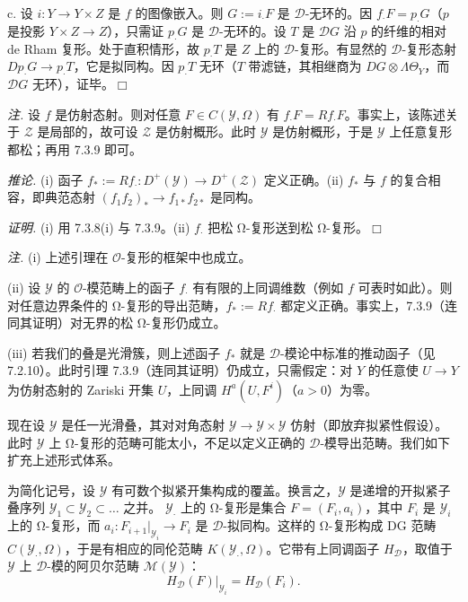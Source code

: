 c. 设 $i:Y\to Y\times Z$ 是 $f$ 的图像嵌入。则 $G:=i_{\cdot}F$ 是 $\mathcal{D}$-无环的。因 $f_{\cdot}F=p_{\cdot}G$（$p$ 是投影 $Y\times Z\to Z$），只需证 $p_{\cdot}G$ 是 $\mathcal{D}$-无环的。设 $T$ 是 $\mathcal{D}G$ 沿 $p$ 的纤维的相对 de Rham 复形。处于直积情形，故 $p_{\cdot}T$ 是 $Z$ 上的 $\mathcal{D}$-复形。有显然的 $\mathcal{D}$-复形态射 $Dp_{\cdot}G\to p_{\cdot}T$，它是拟同构。因 $p_{\cdot}T$ 无环（$T$ 带滤链，其相继商为 $DG\otimes\Lambda\Theta_{Y}$，而 $\mathcal{D}G$ 无环），证毕。\hfill$\Box$

\emph{注.} 设 $f$ 是仿射态射。则对任意 $F\in C(\mathcal{Y},\Omega)$ 有 $f_{\cdot}F=Rf_{\cdot}F$。事实上，该陈述关于 $\mathcal{Z}$ 是局部的，故可设 $\mathcal{Z}$ 是仿射概形。此时 $\mathcal{Y}$ 是仿射概形，于是 $\mathcal{Y}$ 上任意复形都松；再用 7.3.9 即可。

 \emph{推论.} (i) 函子 $f_{*}:=Rf_{\cdot}:D^{+}(\mathcal{Y})\to D^{+}(\mathcal{Z})$ 定义正确。(ii) $f_{*}$ 与 $f$ 的复合相容，即典范态射 $(f_{1}f_{2})_{*}\to f_{1*}f_{2*}$ 是同构。

\emph{证明.} (i) 用 7.3.8(i) 与 7.3.9。(ii) $f_{\cdot}$ 把松 Ω-复形送到松 Ω-复形。\hfill$\Box$

 \emph{注.} (i) 上述引理在 $\mathcal{O}$-复形的框架中也成立。

(ii) 设 $\mathcal{Y}$ 的 $\mathcal{O}$-模范畴上的函子 $f_{\cdot}$ 有有限的上同调维数（例如 $f$ 可表时如此）。则对任意边界条件的 Ω-复形的导出范畴，$f_{*}:=Rf_{\cdot}$ 都定义正确。事实上，7.3.9（连同其证明）对无界的松 Ω-复形仍成立。

(iii) 若我们的叠是光滑簇，则上述函子 $f_{*}$ 就是 $\mathcal{D}$-模论中标准的推动函子（见 7.2.10）。此时引理 7.3.9（连同其证明）仍成立，只需假定：对 $Y$ 的任意使 $U\to Y$ 为仿射态射的 Zariski 开集 $U$，上同调 $H^{a}(U,F^{i})$（$a>0$）为零。

 现在设 $\mathcal{Y}$ 是任一光滑叠，其对对角态射 $\mathcal{Y}\to\mathcal{Y}\times\mathcal{Y}$ 仿射（即放弃拟紧性假设）。此时 $\mathcal{Y}$ 上 Ω-复形的范畴可能太小，不足以定义正确的 $\mathcal{D}$-模导出范畴。我们如下扩充上述形式体系。

为简化记号，设 $\mathcal{Y}$ 有可数个拟紧开集构成的覆盖。换言之，$\mathcal{Y}$ 是递增的开拟紧子叠序列 $\mathcal{Y}_{1}\subset\mathcal{Y}_{2}\subset\ldots$ 之并。
$\mathcal{Y}_{\cdot}$ 上的 Ω-复形是集合 $F=(F_{i},a_{i})$，其中 $F_{i}$ 是 $\mathcal{Y}_{i}$ 上的 Ω-复形，而 $a_{i}:F_{i+1}|_{\mathcal{Y}_{i}}\to F_{i}$ 是 $\mathcal{D}$-拟同构。这样的 Ω-复形构成 DG 范畴 $C(\mathcal{Y}_{\cdot},\Omega)$，于是有相应的同伦范畴 $K(\mathcal{Y}_{\cdot},\Omega)$。它带有上同调函子 $H_{\mathcal{D}}$，取值于 $\mathcal{Y}$ 上 $\mathcal{D}$-模的阿贝尔范畴 $\mathcal{M}(\mathcal{Y})$：
\[
H_{\mathcal{D}}(F)|_{\mathcal{Y}_{i}}=H_{\mathcal{D}}(F_{i}).
\]

